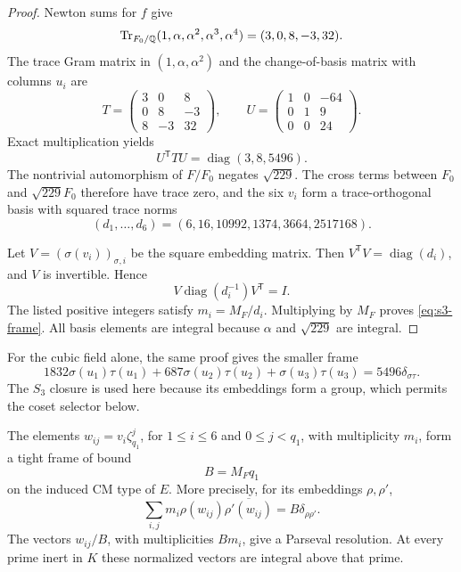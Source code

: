\begin{proof}
Newton sums for $f$ give
\[
 \operatorname{Tr}_{F_0/\mathbb Q}(1,\alpha,\alpha^2,\alpha^3,\alpha^4)
 =(3,0,8,-3,32).
\]
The trace Gram matrix in $(1,\alpha,\alpha^2)$ and the change-of-basis
matrix with columns $u_i$ are
\[
 T=\begin{pmatrix}3&0&8\\0&8&-3\\8&-3&32\end{pmatrix},
 \qquad
 U=\begin{pmatrix}1&0&-64\\0&1&9\\0&0&24\end{pmatrix}.
\]
Exact multiplication yields
\begin{equation}\label{eq:s3-trace-orthogonal}
 U^{\mathsf T}TU=\operatorname{diag}(3,8,5496).
\end{equation}
The nontrivial automorphism of $F/F_0$ negates $\sqrt{229}$.
The cross terms between $F_0$ and $\sqrt{229}F_0$ therefore have
trace zero, and the six $v_i$ form a trace-orthogonal basis with
squared trace norms
\begin{equation}\label{eq:s3-norms}
 (d_1,\ldots,d_6)=(6,16,10992,1374,3664,2517168).
\end{equation}

Let $V=(\sigma(v_i))_{\sigma,i}$ be the square embedding matrix.
Then $V^{\mathsf T}V=\operatorname{diag}(d_i)$, and $V$ is
invertible. Hence
\[
 V\operatorname{diag}(d_i^{-1})V^{\mathsf T}=I.
\]
The listed positive integers satisfy $m_i=M_F/d_i$.
Multiplying by $M_F$ proves \eqref{eq:s3-frame}.
All basis elements are integral because $\alpha$ and $\sqrt{229}$
are integral.
\end{proof}

For the cubic field alone, the same proof gives the smaller frame
\begin{equation}\label{eq:cubic-frame}
 1832\sigma(u_1)\tau(u_1)+687\sigma(u_2)\tau(u_2)
 +\sigma(u_3)\tau(u_3)=5496\delta_{\sigma\tau}.
\end{equation}
The $S_3$ closure is used here because its embeddings form a group,
which permits the coset selector below.

\begin{proposition}
\label{prop:s3-tensor}
The elements $w_{ij}=v_i\zeta_{q_1}^{j}$, for
$1\le i\le6$ and $0\le j<q_1$, with multiplicity $m_i$, form a
tight frame of bound
\[
 B=M_Fq_1
\]
on the induced CM type of $E$. More precisely, for its embeddings
$\rho,\rho'$,
\begin{equation}\label{eq:s3-tensor-frame}
 \sum_{i,j}m_i\rho(w_{ij})\overline{\rho'(w_{ij})}
 =B\delta_{\rho\rho'}.
\end{equation}
The vectors $w_{ij}/B$, with multiplicities $Bm_i$, give a Parseval
resolution. At every prime inert in $K$ these normalized vectors are
integral above that prime.
\end{proposition}


